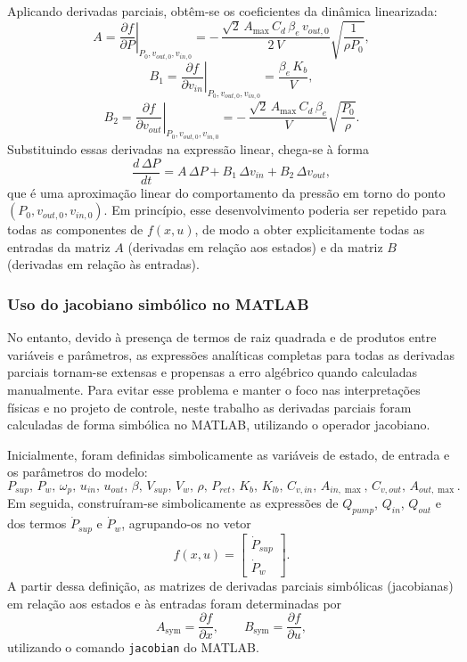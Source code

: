 Aplicando derivadas parciais, obtêm-se os coeficientes da dinâmica linearizada:
\[
    A = \left.\frac{\partial f}{\partial P}\right|_{P_0,v_{out,0},v_{in,0}}
      = -\,\frac{\sqrt{2}\,A_{\max}\,C_d\,\beta_e\,v_{out,0}}{2\,V}
         \sqrt{\frac{1}{\rho P_0}},
\]
\[
    B_1 = \left.\frac{\partial f}{\partial v_{in}}\right|_{P_0,v_{out,0},v_{in,0}}
        = \frac{\beta_e\,K_b}{V},
\]
\[
    B_2 = \left.\frac{\partial f}{\partial v_{out}}\right|_{P_0,v_{out,0},v_{in,0}}
        = -\,\frac{\sqrt{2}\,A_{\max}\,C_d\,\beta_e}{V}
            \sqrt{\frac{P_0}{\rho}}.
\]
Substituindo essas derivadas na expressão linear, chega-se à forma
\[
    \frac{d\,\Delta P}{dt}
    = A\,\Delta P + B_1\,\Delta v_{in} + B_2\,\Delta v_{out},
\]
que é uma aproximação linear do comportamento da pressão em torno do ponto $(P_0, v_{out,0}, v_{in,0})$. Em princípio, esse desenvolvimento poderia ser repetido para todas as componentes de $f(x,u)$, de modo a obter explicitamente todas as entradas da matriz $A$ (derivadas em relação aos estados) e da matriz $B$ (derivadas em relação às entradas).

\subsubsection*{Uso do jacobiano simbólico no MATLAB}

No entanto, devido à presença de termos de raiz quadrada e de produtos entre variáveis e parâmetros, as expressões analíticas completas para todas as derivadas parciais tornam-se extensas e propensas a erro algébrico quando calculadas manualmente. Para evitar esse problema e manter o foco nas interpretações físicas e no projeto de controle, neste trabalho as derivadas parciais foram calculadas de forma simbólica no MATLAB, utilizando o operador jacobiano.

Inicialmente, foram definidas simbolicamente as variáveis de estado, de entrada e os parâmetros do modelo:
\[
    P_{sup},\, P_w,\, \omega_p,\, u_{in},\, u_{out},\,
    \beta,\, V_{sup},\, V_w,\, \rho,\, P_{ret},\,
    K_b,\, K_{lb},\, C_{v,in},\, A_{in,\max},\, C_{v,out},\, A_{out,\max}.
\]
Em seguida, construíram-se simbolicamente as expressões de $Q_{pump}$, $Q_{in}$, $Q_{out}$ e dos termos $\dot{P}_{sup}$ e $\dot{P}_{w}$, agrupando-os no vetor
\[
    f(x,u) =
    \begin{bmatrix}
        \dot{P}_{sup} \\
        \dot{P}_{w}
    \end{bmatrix}.
\]
A partir dessa definição, as matrizes de derivadas parciais simbólicas (jacobianas) em relação aos estados e às entradas foram determinadas por
\[
    A_{\text{sym}} = \frac{\partial f}{\partial x},
    \qquad
    B_{\text{sym}} = \frac{\partial f}{\partial u},
\]
utilizando o comando \texttt{jacobian} do MATLAB.

